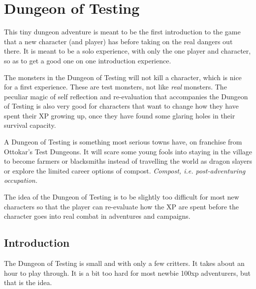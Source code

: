 
%





\section*{Dungeon of Testing}

This tiny dungeon adventure is meant to be the first introduction to the game that a new character (and player) has before taking on the real dangers out there. It is meant to be a solo experience, with only the one player and character, so as to get a good one on one introduction experience.

The monsters in the Dungeon of Testing will not kill a character, which is nice for a first experience. These are test monsters, not like \emph{real} monsters. The peculiar magic of self reflection and re-evaluation that accompanies the Dungeon of Testing is also very good for characters that want to change how they have spent their XP growing up, once they have found some glaring holes in their survival capacity.

A Dungeon of Testing is something most serious towns have, on franchise from Ottokar's Test Dungeons. It will scare some young fools into staying in the village to become farmers or blacksmiths instead of travelling the world as dragon slayers or explore the limited career options of compost. \emph{Compost, i.e. post-adventuring occupation.}

The idea of the Dungeon of Testing is to be slightly too difficult for most new characters so that the player can re-evaluate how the XP are spent before the character goes into real combat in adventures and campaigns.




\subsection*{Introduction}

The Dungeon of Testing is small and with only a few critters. It takes about an hour to play through. It is a bit too hard for most newbie 100xp adventurers, but that is the idea.

